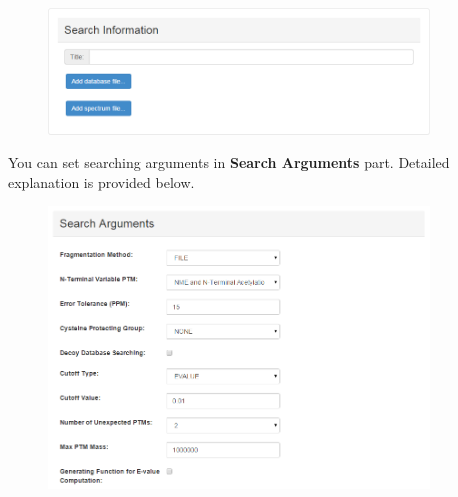 \documentclass[12pt,letterpaper]{article}
\begin{document}
\begin{figure}[H]
\begin{center}
    \includegraphics[width=0.9\textwidth]{fig/5.png}
\end{center}
\end{figure}

You can set searching arguments in \textbf{Search Arguments} part. Detailed
explanation is provided below.

\begin{figure}[H]
\begin{center}
    \includegraphics[width=0.9\textwidth]{fig/6.png}
\end{center}
\end{figure}
\end{document}
